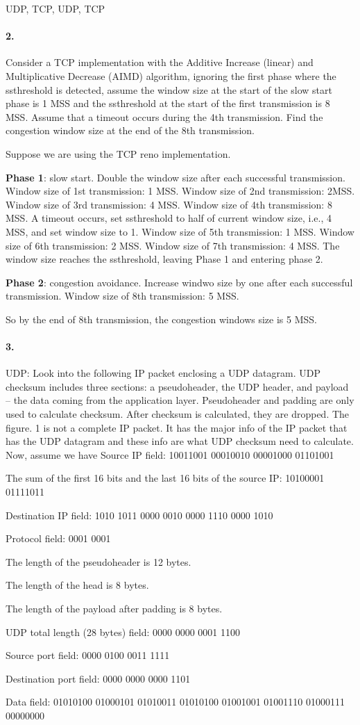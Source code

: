 \documentclass{article}
\begin{document}
UDP, TCP, UDP, TCP

\paragraph{2.} Consider a TCP implementation with the Additive Increase (linear) and Multiplicative Decrease (AIMD) algorithm, ignoring the ﬁrst phase where the ssthreshold is detected, assume the window size at the start of the slow start phase is 1 MSS and the ssthreshold at the start of the ﬁrst transmission is 8 MSS. Assume that a timeout occurs during the 4th transmission. Find the congestion window size at the end of the 8th transmission.

Suppose we are using the TCP reno implementation.

\textbf{Phase 1}: slow start. Double the window size after each successful transmission. Window size of 1st transmission: 1 MSS. Window size of 2nd transmission: 2MSS. Window size of 3rd transmission: 4 MSS. Window size of 4th transmission: 8 MSS. A timeout occurs, set ssthreshold to half of current window size, i.e., 4 MSS, and set window size to 1. Window size of 5th transmission: 1 MSS. Window size of 6th transmission: 2 MSS. Window size of 7th transmission: 4 MSS. The window size reaches the ssthreshold, leaving Phase 1 and entering phase 2.

\textbf{Phase 2}: congestion avoidance. Increase windwo size by one after each successful transmission. Window size of 8th transmission: 5 MSS.

So by the end of 8th transmission, the congestion windows size is 5 MSS.

\paragraph{3.} UDP: Look into the following IP packet enclosing a UDP datagram. UDP checksum includes three sections: a pseudoheader, the UDP header, and payload – the data coming from the application layer.   Pseudoheader and padding are only used to calculate checksum. After checksum is calculated, they are dropped. The figure. 1 is not a complete IP packet. It has the major info of the IP packet that has the UDP datagram and these info are what UDP checksum need to calculate. Now, assume we have
Source IP field: 10011001 00010010 00001000 01101001

The sum of the first 16 bits and the last 16 bits of the source IP: 10100001 01111011

Destination IP field: 1010 1011 0000 0010 0000 1110 0000 1010

Protocol field: 0001 0001

The length of the pseudoheader is 12 bytes.

The length of the head is 8 bytes.

The length of the payload after padding is 8 bytes.

UDP total length (28 bytes) field: 0000 0000 0001 1100

Source port field: 0000 0100 0011 1111

Destination port field: 0000 0000 0000 1101

Data field: 01010100 01000101 01010011 01010100 01001001 01001110 01000111 00000000
\end{document}

